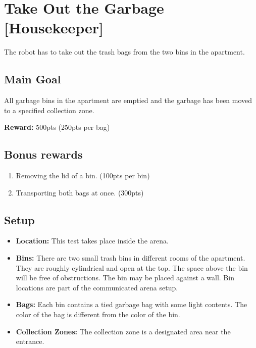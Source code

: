 \section{Take Out the Garbage [Housekeeper]}
The robot has to take out the trash bags from the two bins in the apartment.


\subsection{Main Goal}
All garbage bins in the apartment are emptied and the garbage has been moved to a specified collection zone.

\noindent\textbf{Reward:} 500pts (250pts per bag)

\subsection{Bonus rewards}
\begin{enumerate}[nosep]
	\item Removing the lid of a bin. (100pts per bin) 
	\item Transporting both bags at once. (300pts)
\end{enumerate}

\subsection{Setup}
\begin{itemize}[nosep]
	\item \textbf{Location:} This test takes place inside the arena.
	\item \textbf{Bins:} There are two small trash bins in different rooms of the apartment. They are roughly cylindrical and open at the top. The space above the bin will be free of obstructions. The bin may be placed against a wall. Bin locations are part of the communicated arena setup.
	\item \textbf{Bags:} Each bin contains a tied garbage bag with some light contents. The color of the bag is different from the color of the bin.
	\item \textbf{Collection Zones:} The collection zone is a designated area near the entrance. 
\end{itemize}


